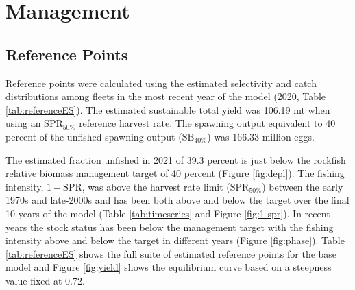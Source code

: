 \documentclass[11pt,
  english,
  a4paper,
]{article}
\begin{document}
\leavevmode\tagmcend\tagstructend\par


\hypertarget{management}{%
\section{Management}\label{management}}

\leavevmode\tagmcend\tagstructend


\hypertarget{reference-points}{%
\subsection{Reference Points}\label{reference-points}}

\leavevmode\tagmcend\tagstructend


Reference points were calculated using the estimated selectivity and catch distributions among fleets in the most recent year of the model (2020, Table \ref{tab:referenceES}). The estimated sustainable total yield was 106.19 mt when using an {\(\text{SPR}_{50\%}\)\leavevmode\tagmcend\tagstructend} reference harvest rate. The spawning output equivalent to 40 percent of the unfished spawning output ({\(\text{SB}_{40\%}\)\leavevmode\tagmcend\tagstructend}) was 166.33 million eggs.

\leavevmode\tagmcend\tagstructend\par


The estimated fraction unfished in 2021 of 39.3 percent is just below the rockfish relative biomass management target of 40 percent (Figure \ref{fig:depl}). The fishing intensity, {\(1-\text{SPR}\)\leavevmode\tagmcend\tagstructend}, was above the harvest rate limit ({\(\text{SPR}_{50\%}\)\leavevmode\tagmcend\tagstructend}) between the early 1970s and late-2000s and has been both above and below the target over the final 10 years of the model (Table \ref{tab:timeseries} and Figure \ref{fig:1-spr}). In recent years the stock status has been below the management target with the fishing intensity above and below the target in different years (Figure \ref{fig:phase}). Table \ref{tab:referenceES} shows the full suite of estimated reference points for the base model and Figure \ref{fig:yield} shows the equilibrium curve based on a steepness value fixed at 0.72.
\end{document}
